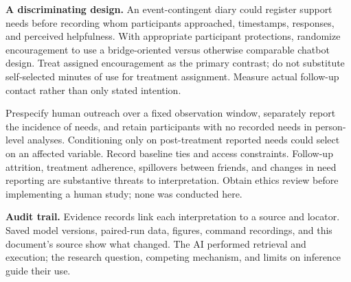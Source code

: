 \documentclass[11pt]{article}
\begin{document}
\textbf{A discriminating design.} An event-contingent diary could register support needs before recording whom participants approached, timestamps, responses, and perceived helpfulness. With appropriate participant protections, randomize encouragement to use a bridge-oriented versus otherwise comparable chatbot design. Treat assigned encouragement as the primary contrast; do not substitute self-selected minutes of use for treatment assignment. Measure actual follow-up contact rather than only stated intention.

Prespecify human outreach over a fixed observation window, separately report the incidence of needs, and retain participants with no recorded needs in person-level analyses. Conditioning only on post-treatment reported needs could select on an affected variable. Record baseline ties and access constraints. Follow-up attrition, treatment adherence, spillovers between friends, and changes in need reporting are substantive threats to interpretation. Obtain ethics review before implementing a human study; none was conducted here.

\textbf{Audit trail.} Evidence records link each interpretation to a source and locator. Saved model versions, paired-run data, figures, command recordings, and this document's source show what changed. The AI performed retrieval and execution; the research question, competing mechanism, and limits on inference guide their use.
\newpage
\small
\end{document}
